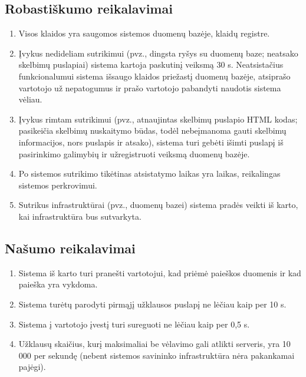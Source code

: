 \documentclass[12pt]{article}
\renewcommand{\thesubsection}{FR\arabic{subsection}}
\renewcommand*{\theenumi}{\thesubsection.\arabic{enumi}}
\renewcommand*{\theenumii}{\thesubsubsection.\theenumi.\arabic{enumii}}
\begin{document}
	\subsection{Robastiškumo reikalavimai}
	\begin{enumerate}[labelindent=10pt,leftmargin=2.2cm]
		\item Visos klaidos yra saugomos sistemos duomenų bazėje, klaidų registre.
		\item Įvykus nedideliam sutrikimui (pvz., dingsta ryšys su duomenų baze; neatsako skelbimų puslapiai) sistema kartoja paskutinį veiksmą 30 s. Neatsistačius funkcionalumui sistema išsaugo klaidos priežastį duomenų bazėje, atsiprašo vartotojo už nepatogumus ir prašo vartotojo pabandyti naudotis sistema vėliau.
		\item Įvykus rimtam sutrikimui (pvz., atnaujintas skelbimų puslapio HTML kodas; pasikeičia skelbimų nuskaitymo būdas, todėl nebeįmanoma gauti skelbimų informacijos, nors puslapis ir atsako), sistema turi gebėti išimti puslapį iš pasirinkimo galimybių ir užregistruoti veiksmą duomenų bazėje.
		\item Po sistemos sutrikimo tikėtinas atsistatymo laikas yra laikas, reikalingas sistemos perkrovimui.
		\item Sutrikus infrastruktūrai (pvz., duomenų bazei) sistema pradės veikti iš karto, kai infrastruktūra bus sutvarkyta.
	\end{enumerate}	
	
	\subsection{Našumo reikalavimai}
	\begin{enumerate}[labelindent=10pt,leftmargin=2.2cm]
		\item Sistema iš karto turi pranešti vartotojui, kad priėmė paieškos duomenis ir kad paieška yra vykdoma.
		\item Sistema turėtų parodyti pirmąjį užklausos puslapį ne lėčiau kaip per 10 s.
		\item Sistema į vartotojo įvestį turi sureguoti ne lėčiau kaip per 0,5 s.
		\item Užklausų skaičius, kurį maksimaliai be vėlavimo gali atlikti serveris, yra 10 000 per sekundę (nebent sistemos savininko infrastruktūra nėra pakankamai pajėgi).
	\end{enumerate}
	
	\pagebreak
	\renewcommand{\thesubsection}{IR\arabic{subsection}}
	\renewcommand*{\theenumi}{IR\arabic{enumi}}
	\renewcommand*{\theenumii}{\theenumi.\arabic{enumii}}
\end{document}
